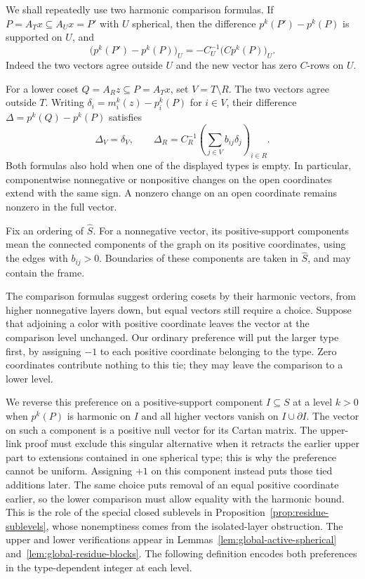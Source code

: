 We shall repeatedly use two harmonic comparison formulas.  If
$P=A_Tx\subseteq A_Ux=P'$ with $U$ spherical, then the difference
$p^k(P')-p^k(P)$ is supported on $U$, and
\begin{equation}\label{eq:global-upper-change}
 \bigl(p^k(P')-p^k(P)\bigr)_U
   =-C_U^{-1}\bigl(Cp^k(P)\bigr)_U.
\end{equation}
Indeed the two vectors agree outside $U$ and the new vector has zero
$C$-rows on $U$.

For a lower coset $Q=A_Rz\subseteq P=A_Tx$, set $V=T\setminus R$.
The two vectors agree outside $T$.  Writing
$\delta_i=m_i^k(z)-p_i^k(P)$ for $i\in V$, their difference
$\Delta=p^k(Q)-p^k(P)$ satisfies
\begin{equation}\label{eq:global-lower-change}
 \Delta_V=\delta_V,
 \qquad
 \Delta_R=C_R^{-1}
       \left(\sum_{j\in V}b_{ij}\delta_j\right)_{i\in R}.
\end{equation}
Both formulas also hold when one of the displayed types is empty.
In particular, componentwise nonnegative or nonpositive changes on the
open coordinates extend with the same sign.  A nonzero change on an open
coordinate remains nonzero in the full vector.

Fix an ordering of $\widehat S$.  For a nonnegative vector, its
positive-support components mean the connected components of the graph
on its positive coordinates, using the edges with $b_{ij}>0$.  Boundaries
of these components are taken in $\widehat S$, and may contain the frame.

The comparison formulas suggest ordering cosets by their harmonic vectors,
from higher nonnegative layers down, but equal vectors still require a choice.  Suppose
that adjoining a color with positive coordinate leaves the vector at the
comparison level unchanged.  Our ordinary preference will put the larger
type first, by assigning $-1$ to each positive coordinate belonging to the
type.  Zero coordinates contribute nothing to this tie; they may leave the
comparison to a lower level.

We reverse this preference on a positive-support component $I\subseteq S$
at a level $k>0$ when $p^k(P)$ is harmonic on $I$ and all higher vectors
vanish on $I\cup\partial I$.  The vector on such a component is a positive
null vector for its Cartan matrix.  The upper-link proof must exclude this
singular alternative when it retracts the earlier upper part to extensions
contained in one spherical type; this is why the preference cannot be uniform.  Assigning
$+1$ on this component instead puts those tied additions later.  The same
choice puts removal of an equal positive coordinate earlier, so the lower
comparison must allow equality with the harmonic bound.  This is the role
of the special closed sublevels in
Proposition~\ref{prop:residue-sublevels}, whose nonemptiness comes from the
isolated-layer obstruction.  The upper and lower verifications appear in
Lemmas~\ref{lem:global-active-spherical} and~\ref{lem:global-residue-blocks}.
The following definition encodes both preferences in the type-dependent
integer at each level.

